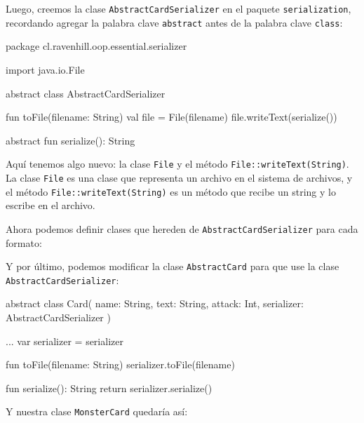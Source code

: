   Luego, creemos la clase \texttt{AbstractCardSerializer} en el paquete \texttt{serialization}, 
  recordando agregar la palabra clave \texttt{abstract} antes de la palabra clave \texttt{class}:

  \begin{kotlin}
    package cl.ravenhill.oop.essential.serializer

    import java.io.File

    abstract class AbstractCardSerializer {
      fun toFile(filename: String) {
        val file = File(filename)
        file.writeText(serialize())
      }

      abstract fun serialize(): String
    }
  \end{kotlin}

  Aquí tenemos algo nuevo: la clase \texttt{File} y el método \texttt{File::writeText(String)}.
  La clase \texttt{File} es una clase que representa un archivo en el sistema de archivos, y el
  método \texttt{File::writeText(String)} es un método que recibe un string y lo escribe en el
  archivo.

  Ahora podemos definir clases que hereden de \texttt{AbstractCardSerializer} para cada formato:




  Y por último, podemos modificar la clase \texttt{AbstractCard} para que use la clase
  \texttt{AbstractCardSerializer}:

  \begin{kotlin}
    abstract class Card(
      name: String, text: String, attack: Int,
      serializer: AbstractCardSerializer
    ) {
      ...
      var serializer = serializer

      fun toFile(filename: String) {
        serializer.toFile(filename)
      }

      fun serialize(): String {
        return serializer.serialize()
      }
    }
  \end{kotlin}

  Y nuestra clase \texttt{MonsterCard} quedaría así:

